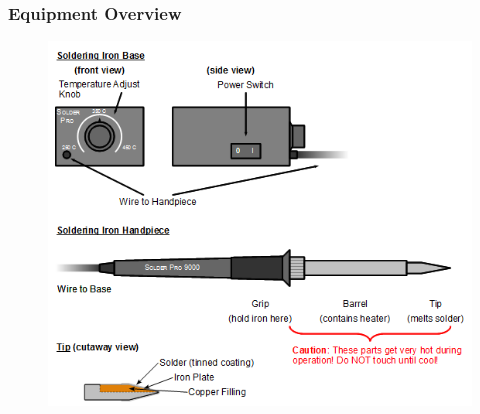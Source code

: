 \documentclass{beamer}
\begin{document}
\begin{frame}
\frametitle{Equipment Overview}
\begin{figure}
\centering
\includegraphics[width=\textwidth,height=0.8\textheight,keepaspectratio]{images-dis1/solder-station}
\end{figure}
\end{frame}

\end{document}
